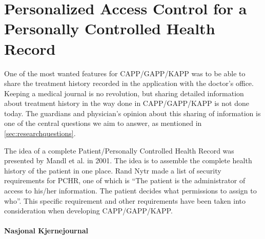 \section{Personalized Access Control for a Personally Controlled Health Record}
\label{personalhealthrecords}

One of the most wanted features for CAPP/GAPP/KAPP was to be able to share the treatment history recorded in the application with the doctor's office. Keeping a medical journal is no revolution, but sharing detailed information about treatment history in the way done in CAPP/GAPP/KAPP is not done today. The guardians and physician's opinion about this sharing of information is one of the central questions we aim to answer, as mentioned in \ref{sec:researchquestions}.

The idea of a complete Patient/Personally Controlled Health Record was presented by Mandl et al.\cite{mandl2007indivo} in 2001. The idea is to assemble the complete health history of the patient in one place. R and Nytr\ø \cite{rostad2008personalized} made a list of security requirements for PCHR, one of which is ``The patient is the administrator of access to his/her information. The patient decides what permissions to assign to who''. This specific requirement and other requirements\cite{rostad2008personalized} have been taken into consideration when developing CAPP/GAPP/KAPP. 



\paragraph{Nasjonal Kjernejournal}
